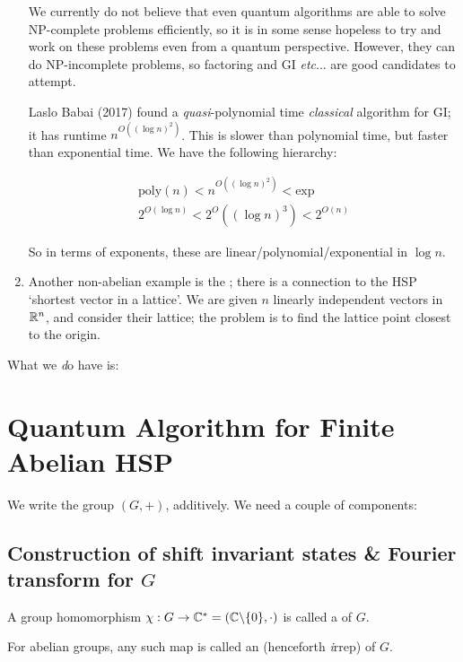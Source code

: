 \documentclass[]{article}
\renewcommand{\it}[1]{\textit{#1}}
\newcommand{\poly}{\textrm{poly}}
\begin{document}
\begin{remark*}
\begin{enumerate}[label = (\alph*)]
	We currently do not believe that even quantum algorithms are able to solve NP-complete problems efficiently, so it is in some sense hopeless to try and work on these problems even from a quantum perspective. However, they can do NP-incomplete problems, so factoring and GI \it{etc}... are good candidates to attempt.
	
	Laslo Babai (2017) found a \it{quasi}-polynomial time \it{classical} algorithm for GI; it has runtime $n^{O((\log n)^2)}$. This is slower than polynomial time, but faster than exponential time. We have the following hierarchy:
	
	\begin{align*}
		\poly (n) < n^{O((\log n)^2)} < \textrm{exp}\\
		2^{O(\log n)} < 2^O((\log n)^3) < 2^{O(n)}
	\end{align*}

So in terms of exponents, these are linear/polynomial/exponential in $\log n$.
\item Another non-abelian example is the ; there is a connection to the HSP `shortest vector in a lattice'. We are given $n$ linearly independent vectors in $\mathbb{R}^n$, and consider their lattice; the problem is to find the lattice point closest to the origin.
\end{enumerate}
\end{remark*}


What we {\it do} have is:

\section*{Quantum Algorithm for Finite Abelian HSP}

We write the group $(G,+)$, additively. We need a couple of components:

\subsection*{Construction of shift invariant states \& Fourier transform for $G$}
\begin{defin*}[Representation of $G$]
A group homomorphism $\chi :G\rightarrow\mathbb{C}^\ast = (\mathbb{C}\backslash\{0\},\cdot)$ is called a  of $G$.

For abelian groups, any such map is called an  (henceforth {\it irrep}) of $G$.
\end{defin*}
\end{document}
